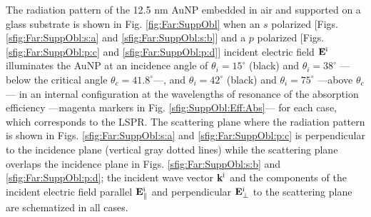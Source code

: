 The radiation pattern of the 12.5 nm AuNP embedded in air and supported on a glass substrate is shown in Fig. \ref{fig:Far:SuppObl} when an $s$ polarized [Figs. \ref{sfig:Far:SuppObl:s:a} and \ref{sfig:Far:SuppObl:s:b}] and a  $p$ polarized [Figs. \ref{sfig:Far:SuppObl:p:c} and \ref{sfig:Far:SuppObl:p:d}] incident electric field $\vb{E}^\text{i}$ illuminates the AuNP at an incidence angle of $\theta_i = 15^\circ$ (black) and $\theta_i = 38^\circ$ ---below the critical angle $\theta_c = 41.8^\circ$---, and $\theta_i = 42^\circ$ (black) and $\theta_i = 75^\circ$ ---above  $\theta_c$--- in an internal configuration at the wavelengths of resonance of the absorption efficiency ---magenta markers in Fig. \ref{sfig:SuppObl:Eff:Abs}--- for each case, which corresponds to the LSPR. The scattering plane where the radiation pattern is shown in Figs. \ref{sfig:Far:SuppObl:s:a} and \ref{sfig:Far:SuppObl:p:c}  is perpendicular to the incidence plane (vertical gray dotted lines) while the scattering plane overlaps the incidence plane in Figs. \ref{sfig:Far:SuppObl:s:b} and \ref{sfig:Far:SuppObl:p:d}; the incident wave vector $\vb{k}^\text{i}$ and the components of the incident electric field parallel $\vb{E}^\text{i}_\parallel$ and perpendicular $\vb{E}^\text{i}_\perp$ to the scattering plane are schematized in all cases.

